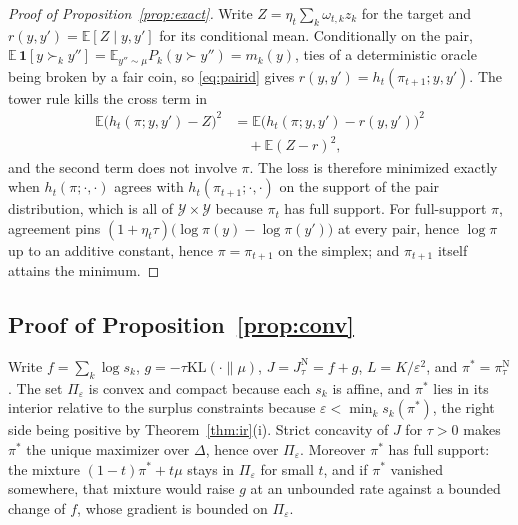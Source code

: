 \documentclass[letterpaper]{article} %
\newcommand{\Y}{\mathcal{Y}}
\newcommand{\KL}{\mathrm{KL}}
\newcommand{\E}{\mathbb{E}}
\begin{document}
\begin{proof}[Proof of Proposition~\ref{prop:exact}]
Write $Z=\eta_t\sum_k\omega_{t,k}z_k$ for the target and $r(y,y')=\E[Z\mid y,y']$ for its conditional mean. Conditionally on the pair, $\E\,\mathbf 1[y\succ_ky'']=\E_{y''\sim\mu}P_k(y\succ y'')=m_k(y)$, ties of a deterministic oracle being broken by a fair coin, so \eqref{eq:pairid} gives $r(y,y')=h_t(\pi_{t+1};y,y')$. The tower rule kills the cross term in
\[
\begin{aligned}
\E\big(h_t(\pi;y,y')-Z\big)^2&=\E\big(h_t(\pi;y,y')-r(y,y')\big)^2\\
&\quad+\E(Z-r)^2,
\end{aligned}
\]
and the second term does not involve $\pi$. The loss is therefore minimized exactly when $h_t(\pi;\cdot,\cdot)$ agrees with $h_t(\pi_{t+1};\cdot,\cdot)$ on the support of the pair distribution, which is all of $\Y\times\Y$ because $\pi_t$ has full support. For full-support $\pi$, agreement pins $(1+\eta_t\tau)\big(\log\pi(y)-\log\pi(y')\big)$ at every pair, hence $\log\pi$ up to an additive constant, hence $\pi=\pi_{t+1}$ on the simplex; and $\pi_{t+1}$ itself attains the minimum.
\end{proof}

\subsection{Proof of Proposition~\ref{prop:conv}}
Write $f=\sum_k\log s_k$, $g=-\tau\KL(\cdot\|\mu)$, $J=J^{\mathrm N}_\tau=f+g$, $L=K/\varepsilon^2$, and $\pi^\ast=\pi^{\mathrm N}_\tau$. The set $\Pi_\varepsilon$ is convex and compact because each $s_k$ is affine, and $\pi^\ast$ lies in its interior relative to the surplus constraints because $\varepsilon<\min_ks_k(\pi^\ast)$, the right side being positive by Theorem~\ref{thm:ir}(i). Strict concavity of $J$ for $\tau>0$ makes $\pi^\ast$ the unique maximizer over $\Delta$, hence over $\Pi_\varepsilon$. Moreover $\pi^\ast$ has full support: the mixture $(1-t)\pi^\ast+t\mu$ stays in $\Pi_\varepsilon$ for small $t$, and if $\pi^\ast$ vanished somewhere, that mixture would raise $g$ at an unbounded rate against a bounded change of $f$, whose gradient is bounded on $\Pi_\varepsilon$.
\end{document}
